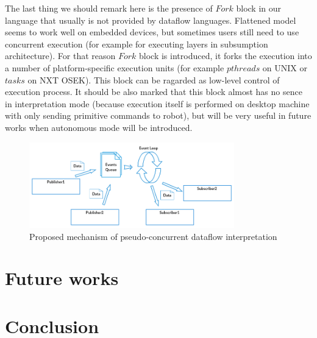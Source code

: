 \documentclass[conference,compsoc]{IEEEtran}
\begin{document}
The last thing we should remark here is the presence of $Fork$ block in our language that usually is not provided by dataflow languages. Flattened model seems to work well on embedded devices, but sometimes users still need to use concurrent execution (for example for executing layers in subsumption architecture). For that reason $Fork$ block is introduced, it forks the execution into a number of platform-specific execution units (for example $pthreads$ on UNIX or $tasks$ on NXT OSEK). This block can be ragarded as low-level control of execution process. It should be also marked that this block almost has no sence in interpretation mode (because execution itself is performed on desktop machine with only sending primitive commands to robot), but will be very useful in future works when autonomous mode will be introduced.

\begin{figure}[ht]
	\centering
	\includegraphics[width=3.5in]{Interaction.png}
	\caption{Proposed mechanism of pseudo-concurrent dataflow interpretation}
	\label{image:interpreter-interaction}
\end{figure}

\section{Future works}
\label{sec:Future}

\section{Conclusion}


\newpage


\end{document}
